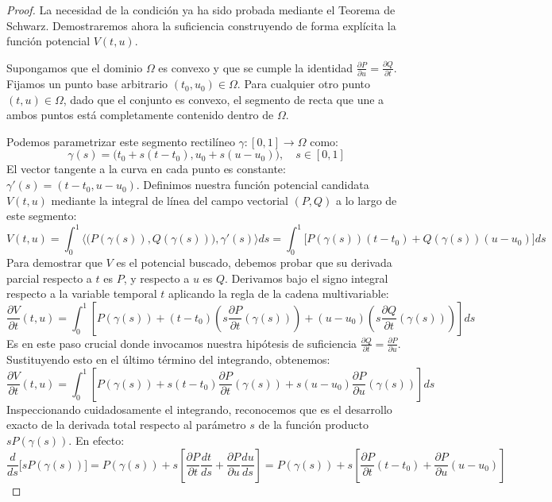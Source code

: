 \begin{proof}
    La necesidad de la condición ya ha sido probada mediante el Teorema de Schwarz. Demostraremos ahora la suficiencia construyendo de forma explícita la función potencial $V(t,u)$.
    
    Supongamos que el dominio $\Omega$ es convexo y que se cumple la identidad $\frac{\partial P}{\partial u} = \frac{\partial Q}{\partial t}$. Fijamos un punto base arbitrario $(t_0, u_0) \in \Omega$. Para cualquier otro punto $(t,u) \in \Omega$, dado que el conjunto es convexo, el segmento de recta que une a ambos puntos está completamente contenido dentro de $\Omega$.
    
    Podemos parametrizar este segmento rectilíneo $\gamma: [0,1] \to \Omega$ como:
    \[
        \gamma(s) = \big( t_0 + s(t-t_0), u_0 + s(u-u_0) \big), \quad s \in [0,1]
    \]
    El vector tangente a la curva en cada punto es constante: $\gamma'(s) = (t-t_0, u-u_0)$. 
    Definimos nuestra función potencial candidata $V(t,u)$ mediante la integral de línea del campo vectorial $(P,Q)$ a lo largo de este segmento:
    \[
        V(t,u) = \int_0^1 \big\langle \big(P(\gamma(s)), Q(\gamma(s))\big), \gamma'(s) \big\rangle ds = \int_0^1 \Big[ P(\gamma(s))(t-t_0) + Q(\gamma(s))(u-u_0) \Big] ds
    \]
    Para demostrar que $V$ es el potencial buscado, debemos probar que su derivada parcial respecto a $t$ es $P$, y respecto a $u$ es $Q$. Derivamos bajo el signo integral respecto a la variable temporal $t$ aplicando la regla de la cadena multivariable:
    \[
        \frac{\partial V}{\partial t}(t,u) = \int_0^1 \left[ P(\gamma(s)) + (t-t_0) \left( s \frac{\partial P}{\partial t}(\gamma(s)) \right) + (u-u_0) \left( s \frac{\partial Q}{\partial t}(\gamma(s)) \right) \right] ds
    \]
    Es en este paso crucial donde invocamos nuestra hipótesis de suficiencia $\frac{\partial Q}{\partial t} = \frac{\partial P}{\partial u}$. Sustituyendo esto en el último término del integrando, obtenemos:
    \[
        \frac{\partial V}{\partial t}(t,u) = \int_0^1 \left[ P(\gamma(s)) + s(t-t_0) \frac{\partial P}{\partial t}(\gamma(s)) + s(u-u_0) \frac{\partial P}{\partial u}(\gamma(s)) \right] ds
    \]
    Inspeccionando cuidadosamente el integrando, reconocemos que es el desarrollo exacto de la derivada total respecto al parámetro $s$ de la función producto $s P(\gamma(s))$. En efecto:
    \[
        \frac{d}{ds} \Big[ s P(\gamma(s)) \Big] = P(\gamma(s)) + s \left[ \frac{\partial P}{\partial t} \frac{dt}{ds} + \frac{\partial P}{\partial u} \frac{du}{ds} \right] = P(\gamma(s)) + s \left[ \frac{\partial P}{\partial t} (t-t_0) + \frac{\partial P}{\partial u} (u-u_0) \right]
\]
\end{proof}

